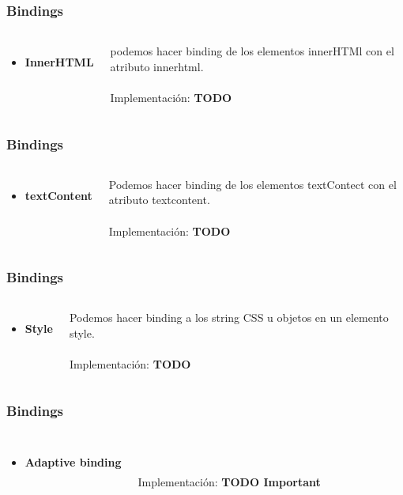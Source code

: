 \documentclass{beamer}
\begin{document}
\begin{frame}
\frametitle{Bindings}
\begin{columns}[c]
\begin{itemize}
\item \textbf{InnerHTML}
\end{itemize}
podemos hacer binding de los elementos innerHTMl con el atributo innerhtml.
\\~\\
Implementaci\'on: \textbf{TODO}
\end{columns}
\end{frame}
\begin{frame}
\frametitle{Bindings}
\begin{columns}[c]
\begin{itemize}
\item \textbf{textContent}
\end{itemize}
Podemos hacer binding de los elementos textContect con el atributo textcontent.
\\~\\
Implementaci\'on: \textbf{TODO}
\end{columns}
\end{frame}
\begin{frame}
\frametitle{Bindings}
\begin{columns}[c]
\begin{itemize}
\item \textbf{Style}
\end{itemize}
Podemos hacer binding a los string CSS u objetos en un elemento style.
\\~\\
Implementaci\'on: \textbf{TODO}
\end{columns}
\end{frame}
\begin{frame}
\frametitle{Bindings}
\begin{columns}[c]
\begin{itemize}
\item \textbf{Adaptive binding}
\end{itemize}
\\~\\
Implementaci\'on: \textbf{TODO Important}
\end{columns}
\end{frame}
\end{document}
